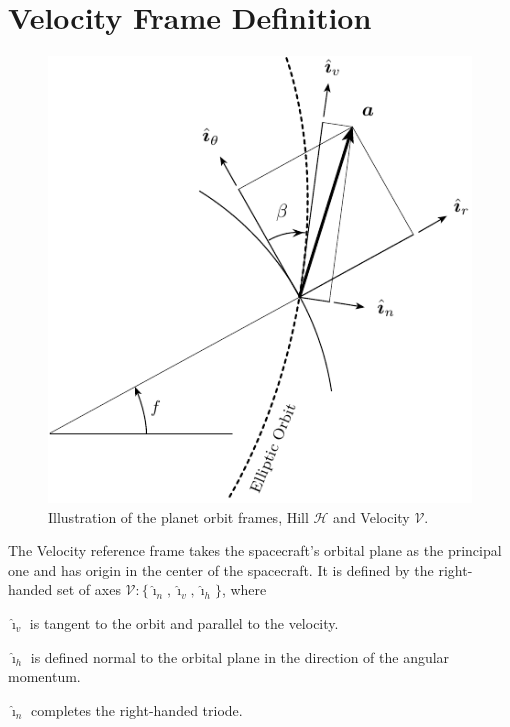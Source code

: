 \documentclass[]{AVSSimReportMemo}
\begin{document}
\section{Velocity Frame Definition}
\begin{figure}[htb]
  \centerline{ \includegraphics{Figures/Fig2} }
  \caption{Illustration of the planet orbit frames, Hill $\mathcal{H}$ and Velocity $\mathcal{V}$.}
  \label{fig:Fig1}
\end{figure}
The Velocity reference frame takes the spacecraft's orbital plane as the principal one and has origin in the center of the spacecraft. It is defined by the right-handed set of axes $\mathcal{V}:\{ \hat{\bm\imath}_{n}, \hat{\bm\imath}_{v}, \hat{\bm\imath}_{h} \}$, where\par
$\hat {\bm\imath}_{v}$  is tangent to the orbit and parallel to the velocity. \par
$\hat {\bm\imath}_{h}$ is defined normal to the orbital plane in the direction of the angular momentum. \par
$\hat {\bm\imath}_{n}$ completes the right-handed triode.\par
\end{document}
